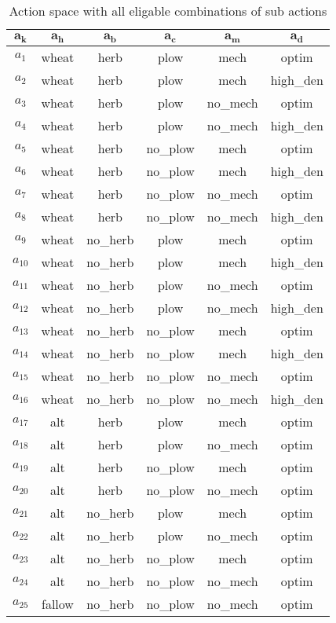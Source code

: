 \documentclass[12pt, a4paper]{article}
\begin{document}
\begin{longtable}[h]{c c c c c c}
\caption{Action space with all eligable combinations of sub actions\label{table:action_space}}\\
	\hline
	$\mathbf{a_k}$ & $\mathbf{a_h}$ & $\mathbf{a_b}$ & $\mathbf{a_c}$ & $\mathbf{a_m}$ & $\mathbf{a_d}$\\
	\hline
	$a_1$ & wheat & herb & plow & mech & optim\\
	$a_2$ & wheat & herb & plow & mech & high\_den\\
	$a_3$ & wheat & herb & plow & no\_mech & optim\\
	$a_4$ & wheat & herb & plow & no\_mech & high\_den\\
	$a_5$ & wheat & herb & no\_plow & mech & optim\\
	$a_6$ & wheat & herb & no\_plow & mech & high\_den\\
	$a_7$ & wheat & herb & no\_plow & no\_mech & optim\\
	$a_8$ & wheat & herb & no\_plow & no\_mech & high\_den\\
	$a_9$ & wheat & no\_herb & plow & mech & optim\\
	$a_{10}$ & wheat & no\_herb & plow & mech & high\_den\\
	$a_{11}$ & wheat & no\_herb & plow & no\_mech & optim\\
	$a_{12}$ & wheat & no\_herb & plow & no\_mech & high\_den\\
	$a_{13}$ & wheat & no\_herb & no\_plow & mech & optim\\
	$a_{14}$ & wheat & no\_herb & no\_plow & mech & high\_den\\
	$a_{15}$ & wheat & no\_herb & no\_plow & no\_mech & optim\\
	$a_{16}$ & wheat & no\_herb & no\_plow & no\_mech & high\_den\\
	$a_{17}$ & alt & herb & plow & mech & optim\\
	$a_{18}$ & alt & herb & plow & no\_mech & optim\\
	$a_{19}$ & alt & herb & no\_plow & mech & optim\\
	$a_{20}$ & alt & herb & no\_plow & no\_mech & optim\\
	$a_{21}$ & alt & no\_herb & plow & mech & optim\\
	$a_{22}$ & alt & no\_herb & plow & no\_mech & optim\\
	$a_{23}$ & alt & no\_herb & no\_plow & mech & optim\\
	$a_{24}$ & alt & no\_herb & no\_plow & no\_mech & optim\\
	$a_{25}$ & fallow & no\_herb & no\_plow & no\_mech & optim\\
	\hline
\end{longtable}


 

\end{document}
